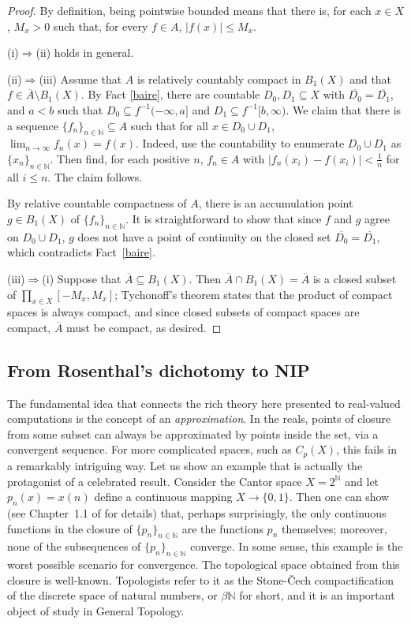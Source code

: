 \documentclass[psamsfonts]{amsart}
\theoremstyle{definition}
\theoremstyle{remark}
\numberwithin{equation}{section}
\begin{document}
\begin{proof}
    By definition, being pointwise bounded means that there is, for each $x\in X$, $M_x>0$ such that, for every $f\in A$, $|f(x)|\leq M_x$.

    (i)$\Rightarrow$(ii) holds in general. 

    (ii)$\Rightarrow$(iii) Assume that $A$ is relatively countably compact in $B_1(X)$ and that $f\in\overline A\setminus B_1(X)$. By Fact \ref{baire}, there are countable $D_0,D_1\subseteq X$ with $\overline {D_0}=\overline{D_1}$, and $a<b$ such that $D_0\subseteq f^{-1}(-\infty,a]$ and $D_1\subseteq f^{-1}[b,\infty)$. We claim that there is a sequence $\{f_n\}_{n\in\mathbb N}\subseteq A$ such that for all $x\in D_0\cup D_1$, $\lim_{n\to\infty}f_n(x)=f(x)$. Indeed, use the countability to enumerate $D_0\cup D_1$ as $\{x_n\}_{n\in\mathbb N}$. Then find, for each positive $n$, $f_n\in A$ with $|f_n(x_i)-f(x_i)|<\frac1n$ for all $i\leq n$. The claim follows.

    By relative countable compactness of $A$, there is an accumulation point $g\in B_1(X)$ of $\{f_n\}_{n\in\mathbb N}$. It is straightforward to show that since $f$ and $g$ agree on $D_0\cup D_1$, $g$ does not have a point of continuity on the closed set $\overline{D_0}=\overline{D_1}$, which contradicts Fact~\ref{baire}.

    (iii)$\Rightarrow$(i) Suppose that $\overline A\subseteq B_1(X)$. Then $\overline{A}\cap B_1(X)=\overline A$ is a closed subset of $\prod_{x\in X}[-M_x,M_x]$; Tychonoff's theorem states that the product of compact spaces is always compact, and since closed subsets of compact spaces are compact, $\overline A$ must be compact, as desired.
\end{proof}

\subsection{From Rosenthal's dichotomy to NIP}

The fundamental idea that connects the rich theory here presented to real-valued computations is the concept of an \emph{approximation}. In the reals, points of closure from some subset can always be approximated by points inside the set, via a convergent sequence. For more complicated spaces, such as $C_p(X)$, this fails in a remarkably intriguing way. Let us show an example that is actually the protagonist of a celebrated result. Consider the Cantor space $X=2^\mathbb N$ and let $p_n(x)=x(n)$ define a continuous mapping $X\to\{0,1\}$. Then one can show (see Chapter~1.1 of \cite{Todorcevic_1997_TopicsTop} for details) that, perhaps surprisingly, the only continuous functions in the closure of $\{p_n\}_{n\in\mathbb N}$ are the functions $p_n$ themselves; moreover, none of the subsequences of $\{p_n\}_{n\in\mathbb N}$ converge. In some sense, this example is the worst possible scenario for convergence. The topological space obtained from this closure is well-known. Topologists refer to it as the Stone-Čech compactification of the discrete space of natural numbers, or $\beta\mathbb N$ for short, and it is an important object of study in General Topology.
\end{document}
